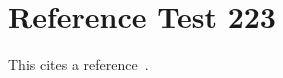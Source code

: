 \documentclass{article}
\begin{document}
\section{Reference Test 223}
This cites a reference~\cite{test223}.

\end{document}
